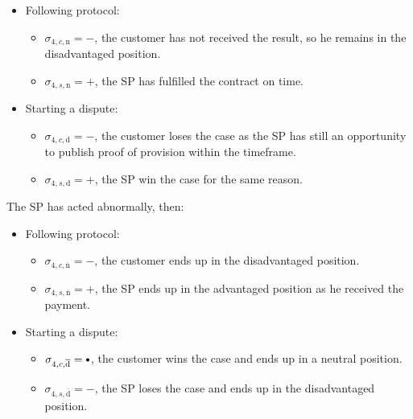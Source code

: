 \documentclass{ieeeaccess}
\newcommand\sbullet[1][.75]{\mathbin{\ThisStyle{\vcenter{\hbox{%
  \scalebox{#1}{$\SavedStyle\bullet$}}}}}%
}
\begin{document}
\begin{itemize}
\item
  Following protocol:

  \begin{itemize}
  
  \item
    \(\sigma_{4, c, \mathrm{n}} = -\), the customer has not received the result, so he remains in the disadvantaged position. 
  \item
    \(\sigma_{4, s, \mathrm{n}} = +\), the SP has fulfilled the contract on time.
  \end{itemize}
\item
  Starting a dispute:

  \begin{itemize}
  
  \item
    \(\sigma_{4, c, \mathrm{d}} = -\), the customer loses the case as the SP has still an opportunity to publish proof of provision within the timeframe. 
  \item
    \(\sigma_{4, s, \mathrm{d}} = +\), the SP win the case for the same reason.
  \end{itemize}
\end{itemize}

The SP has acted abnormally, then:

\begin{itemize}
\item
  Following protocol:

  \begin{itemize}
  
  \item
    \(\sigma_{4, c, \overline{\mathrm{n}}} = -\), the customer ends up in the disadvantaged position. 
  \item
    \(\sigma_{4, s, \overline{\mathrm{n}}} = +\), the SP ends up in the advantaged position as he received the payment. 
  \end{itemize}
\item
  Starting a dispute:

  \begin{itemize}
  
  \item
    \(\sigma_{4, c, \overline{\mathrm{d}}} = \sbullet\), the customer wins the case and ends up in a neutral position. 
  \item
    \(\sigma_{4, s, \overline{\mathrm{d}}} = -\), the SP loses the case and ends up in the disadvantaged position. 
  \end{itemize}
\end{itemize}
\end{document}
